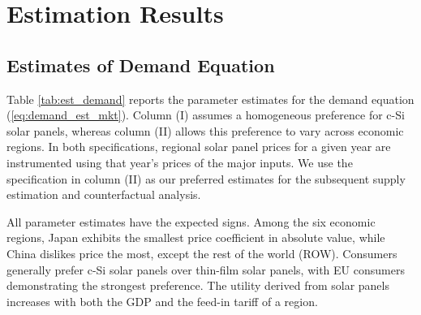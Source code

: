 \documentclass[12pt, letter]{article}
\begin{document}
\section{Estimation Results}
\label{sec:est_results}

\subsection{Estimates of Demand Equation}
\label{subsec:est_results_demand}

Table \ref{tab:est_demand} reports the parameter estimates for the demand equation (\ref{eq:demand_est_mkt}). Column (I) assumes a homogeneous preference for c-Si solar panels, whereas column (II) allows this preference to vary across economic regions. In both specifications, regional solar panel prices for a given year are instrumented using that year’s prices of the major inputs. We use the specification in column (II) as our preferred estimates for the subsequent supply estimation and counterfactual analysis.

All parameter estimates have the expected signs. Among the six economic regions, Japan exhibits the smallest price coefficient in absolute value, while China dislikes price the most, except the rest of the world (ROW). 
Consumers generally prefer c-Si solar panels over thin-film solar panels, with EU consumers demonstrating the strongest preference. The utility derived from solar panels increases with both the GDP and the feed-in tariff of a region.
\end{document}
